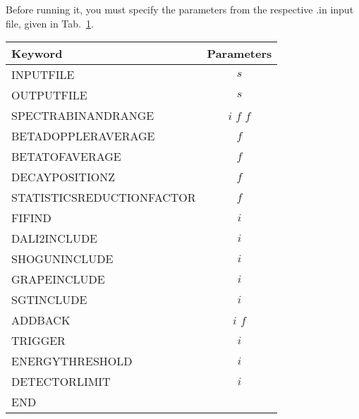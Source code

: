 \documentclass[12pt]{book}
\begin{document}
Before running it, you must specify the parameters from the respective {\ttfamily *.in} input
file, given in Tab.~\ref{tab:RECONSTRUCTORKEY}.

\begin{table}
  \centering
  \label{tab:RECONSTRUCTORKEY}
  \begin{tabular}{|l||c|}
    \hline
    Keyword & Parameters \\
    \hline
    \hline
    INPUTFILE                        & $s$             \\
    OUTPUTFILE                       & $s$             \\
    SPECTRABINANDRANGE               & $i$ $f$ $f$     \\
    BETADOPPLERAVERAGE               & $f$             \\
    BETATOFAVERAGE                   & $f$             \\
    DECAYPOSITIONZ                   & $f$             \\
    STATISTICSREDUCTIONFACTOR        & $f$             \\
    FIFIND                           & $i$             \\
    DALI2INCLUDE                     & $i$             \\
    SHOGUNINCLUDE                    & $i$             \\
    GRAPEINCLUDE                     & $i$             \\
    SGTINCLUDE                       & $i$             \\
    ADDBACK                          & $i$ $f$         \\
    TRIGGER                          & $i$             \\ 
    ENERGYTHRESHOLD                  & $i$             \\  
    DETECTORLIMIT                    & $i$             \\
    END                              &                 \\
    \hline
  \end{tabular}
\end{table}
\end{document}
